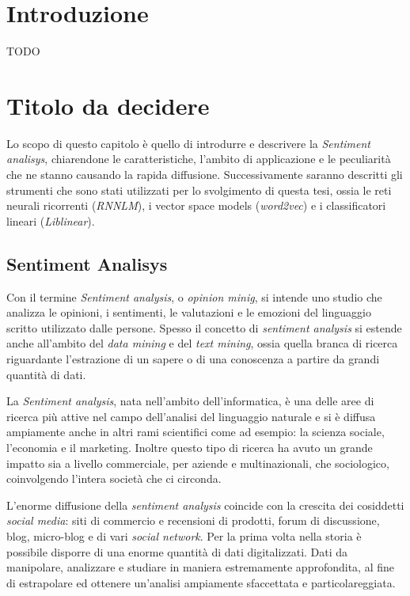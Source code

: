 \documentclass[a4paper,12pt,openright,twoside]{report}
\theoremstyle{definition}
\begin{document}
\chapter{Introduzione}
\cite{Mik2014} 
TODO
\cite{Mik2011}

\chapter{Titolo da decidere}
Lo scopo di questo capitolo è quello di introdurre e descrivere la 
\emph{Sentiment analisys}, chiarendone le caratteristiche, l'ambito di applicazione e 
le peculiarità che ne stanno causando la rapida diffusione. 
Successivamente saranno descritti gli strumenti che sono stati utilizzati per lo svolgimento di questa tesi,
ossia le reti neurali ricorrenti (\emph{RNNLM}), i vector space models (\emph{word2vec}) e 
i classificatori lineari (\emph{Liblinear}).

\section{Sentiment Analisys}
Con il termine \emph{Sentiment analysis}, o \emph{opinion minig}, si intende uno studio 
che analizza le opinioni, i sentimenti, le valutazioni e le
emozioni del linguaggio scritto utilizzato dalle persone.
Spesso il concetto di \emph{sentiment analysis} si estende anche all'ambito del \emph{data mining} e
del \emph{text mining}, ossia quella branca di ricerca riguardante l'estrazione di un sapere o 
di una conoscenza a partire da grandi quantità di dati.

La \emph{Sentiment analysis}, nata nell'ambito dell'informatica, è una delle aree di ricerca più attive 
nel campo dell'analisi del linguaggio naturale e si è diffusa
ampiamente anche in altri rami scientifici come ad esempio: la scienza sociale,
l'economia e il marketing. Inoltre questo tipo di ricerca
ha avuto un grande impatto sia a livello commerciale, per aziende e multinazionali, che sociologico, 
coinvolgendo l'intera società che ci circonda.

L'enorme diffusione della \emph{sentiment analysis} coincide con la 
crescita dei cosiddetti \emph{social media}: siti di commercio e recensioni di prodotti,
forum di discussione, blog, micro-blog e di vari \emph{social network}.
Per la prima volta nella storia è possibile disporre di una
enorme quantità di dati digitalizzati. Dati da manipolare, analizzare e studiare in maniera
estremamente approfondita, al fine di estrapolare ed ottenere un'analisi
ampiamente sfaccettata e particolareggiata.
\end{document}
